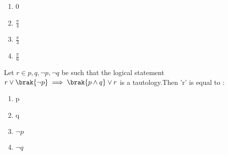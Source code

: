     \begin{enumerate}
        \item 0
        \item $\frac{\pi}{4}$
        \item $\frac{\pi}{3}$
        \item $\frac{\pi}{6}$
    \end{enumerate}
    \hfill{}
    \item[5.] Let $r \in {p,q,\neg p,\neg q}$ be such that the logical statement $r\lor \brak{\neg p}\implies\brak{p\land q}\lor r$ is a tautology.Then 'r' is equal to :
    \begin{enumerate}
        \item p
        \item q
        \item $\neg p$
        \item $\neg q$
    \end{enumerate}
    \hfill{}
